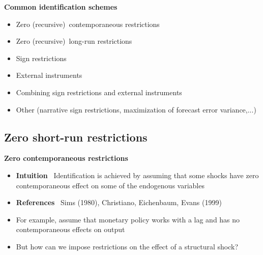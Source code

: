 \documentclass[10pt,english,t,aspectratio=169,ignorenonframetext]{beamer}
\begin{document}
\begin{frame}
{\textbf{Common identification schemes}}\bigskip\smallskip

\begin{itemize}
\item Zero (recursive)\ contemporaneous restrictions\bigskip

\item Zero (recursive)\ long-run restrictions\bigskip

\item Sign restrictions\bigskip

\item External instruments\bigskip

\item Combining sign restrictions and external instruments\bigskip

\item Other (narrative sign restrictions, maximization of forecast error
variance,...)
\end{itemize}
\end{frame}


\subsection{Zero short-run restrictions}

\begin{frame}
\vspace{3cm} \color{title}\bigskip

\color{note}
\end{frame}


\begin{frame}
{\textbf{Zero contemporaneous restrictions}}\bigskip\bigskip

\begin{itemize}
\item \textbf{Intuition} \ Identification is achieved by assuming that some
shocks have zero contemporaneous effect on some of the endogenous variables
\bigskip\medskip

\item \textbf{References} \ Sims (1980), Christiano, Eichenbaum, Evans
(1999)\bigskip \medskip \pause

\item For example, assume that monetary policy works with a lag and has no
contemporaneous effects on output\bigskip \medskip \pause

\item But how can we impose restrictions on the effect of a structural shock?
\end{itemize}
\end{frame}
\end{document}
